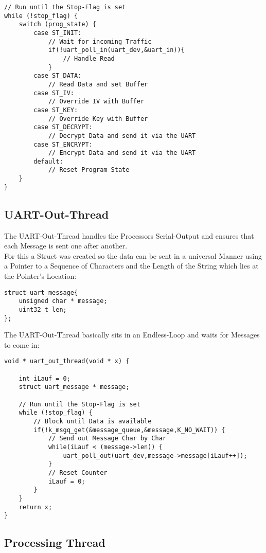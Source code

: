 \begin{lstlisting}[style=CStyle,caption=State Machine Pseudo-Code]
// Run until the Stop-Flag is set
while (!stop_flag) {
	switch (prog_state) {
		case ST_INIT:
            // Wait for incoming Traffic
            if(!uart_poll_in(uart_dev,&uart_in)){
				// Handle Read
			}
	    case ST_DATA:
			// Read Data and set Buffer
	    case ST_IV:
			// Override IV with Buffer
	    case ST_KEY:
			// Override Key with Buffer
	    case ST_DECRYPT:
			// Decrypt Data and send it via the UART
	    case ST_ENCRYPT:
			// Encrypt Data and send it via the UART
	    default:
			// Reset Program State
	}
}
\end{lstlisting}

\subsection{UART-Out-Thread}

The UART-Out-Thread handles the Processors Serial-Output and ensures
that each Message is sent one after another.
\\
For this a Struct was created so the data can be sent in a universal
Manner using a Pointer to a Sequence of Characters and the Length of
the String which lies at the Pointer's Location:

\begin{lstlisting}[style=CStyle,caption=Message Struct Definition]
struct uart_message{
	unsigned char * message;
	uint32_t len;
};
\end{lstlisting}

\pagebreak

The UART-Out-Thread basically sits in an Endless-Loop and waits
for Messages to come in:

\begin{lstlisting}[style=CStyle,caption=UART Out Thread Pseudo-Code]
void * uart_out_thread(void * x) {

	int iLauf = 0;
	struct uart_message * message;

	// Run until the Stop-Flag is set
	while (!stop_flag) {
		// Block until Data is available
		if(!k_msgq_get(&message_queue,&message,K_NO_WAIT)) {
			// Send out Message Char by Char
			while(iLauf < (message->len)) {
				uart_poll_out(uart_dev,message->message[iLauf++]);
			}
			// Reset Counter
			iLauf = 0;
		}
	}
	return x;
}
\end{lstlisting}

\pagebreak

\subsection{Processing Thread}

